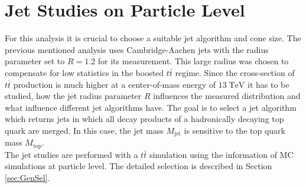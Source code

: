 \section{Jet Studies on Particle Level}
\label{sec:jet_studies}
	For this analysis it is crucial to choose a suitable jet algorithm and cone size. The previous mentioned analysis \cite{torben_paper} uses Cambridge-Aachen jets with the radius parameter set to $R=1.2$ for its measurement. This large radius was chosen to compensate for low statistics in the boosted $t\bar{t}$ regime. Since the cross-section of $t\bar{t}$ production is much higher at a center-of-mass energy of $13\;\text{TeV}$ it has to be studied, how the jet radius parameter $R$ influences the measured distribution and what influence different jet algorithms have. The goal is to select a jet algorithm which returns jets in which all decay products of a hadronically decaying top quark are merged. In this case, the jet mass $M_\text{jet}$ is sensitive to the top quark mass $M_\text{top}$.
	\\
	The jet studies are performed with a $t\bar{t}$ simulation using the information of MC simulations at particle level. The detailed selection is described in Section \ref{sec:GenSel}.

